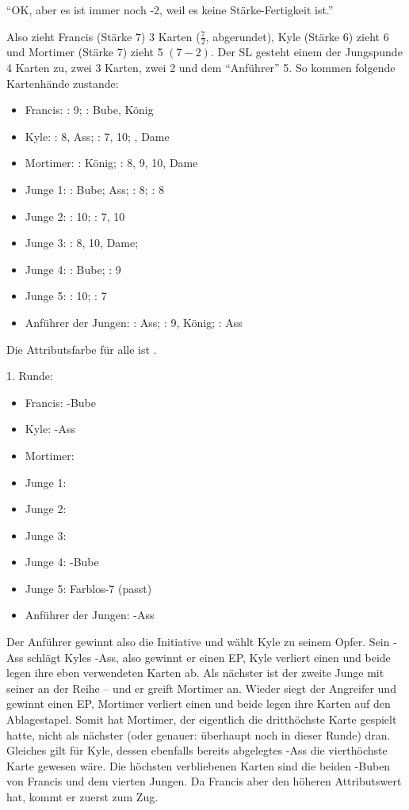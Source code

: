 "`OK, aber es ist immer noch -2, weil es keine Stärke-Fertigkeit ist."'

Also zieht Francis (Stärke 7) 3 Karten (\(\frac{7}{2}\), abgerundet), Kyle (Stärke 6) zieht 6 und Mortimer (Stärke 7) zieht 5 \((7 - 2)\).
Der SL gesteht einem der Jungspunde 4 Karten zu, zwei 3 Karten, zwei 2 und dem "`Anführer"' 5.
So kommen folgende Kartenhände zustande:
\begin {itemize}
\item Francis: \herz: 9; \pik: Bube, König
\item Kyle: \karo: 8, Ass; \pik: 7, 10; , Dame
\item Mortimer: \herz: König; \kreuz: 8, 9, 10, Dame
\item Junge 1: \herz: Bube; Ass; \karo: 8; \pik: 8
\item Junge 2: \pik: 10; \kreuz: 7, 10
\item Junge 3: \herz: 8, 10, Dame;
\item Junge 4: \pik: Bube; \kreuz: 9
\item Junge 5: \karo: 10; \pik: 7
\item Anführer der Jungen: \herz: Ass; \karo: 9, König; \kreuz: Ass
\end {itemize}
Die Attributsfarbe für alle ist \kreuz.

1. Runde:
\begin {itemize}
\item Francis: \pik-Bube
\item Kyle: \karo-Ass
\item Mortimer: 
\item Junge 1: 
\item Junge 2: 
\item Junge 3: 
\item Junge 4: \pik-Bube
\item Junge 5: Farblos-7 (passt)
\item Anführer der Jungen: \kreuz-Ass
\end {itemize}

Der Anführer gewinnt also die Initiative und wählt Kyle zu seinem Opfer. Sein \kreuz-Ass schlägt Kyles \karo-Ass, also gewinnt er einen EP, Kyle verliert einen und beide legen ihre eben verwendeten Karten ab. Als nächster ist der zweite Junge mit seiner  an der Reihe -- und er greift Mortimer an. Wieder siegt der Angreifer und gewinnt einen EP, Mortimer verliert einen und beide legen ihre Karten auf den Ablagestapel. Somit hat Mortimer, der eigentlich die dritthöchste Karte gespielt hatte, nicht als nächster (oder genauer: überhaupt noch in dieser Runde) dran. Gleiches gilt für Kyle, dessen ebenfalls bereits abgelegtes \karo-Ass die vierthöchste Karte gewesen wäre. Die höchsten verbliebenen Karten sind die beiden \pik-Buben von Francis und dem vierten Jungen. Da Francis aber den höheren Attributswert hat, kommt er zuerst zum Zug.

